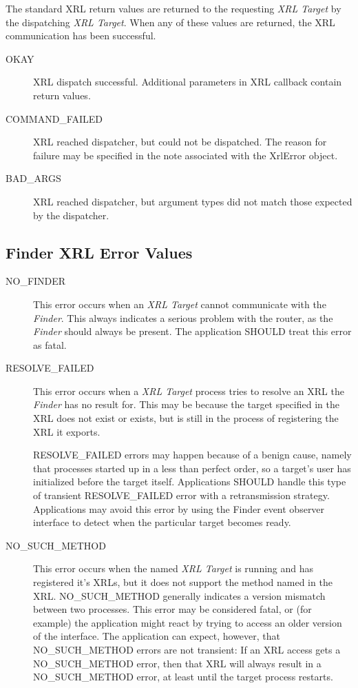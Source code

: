 \documentclass[11pt]{article}
\makeatletter
\newcommand{\finder} {{\em Finder}\@\xspace}
\newcommand{\xt} {{\em XRL Target}\@\xspace}
\makeatother
\begin{document}
The standard XRL return values are returned to the requesting \xt by
the dispatching \xt.  When any of these values are returned, the XRL
communication has been successful.

\begin{description}

  \item [OKAY] XRL dispatch successful.  Additional parameters in
  XRL callback contain return values.

  \item [COMMAND\_FAILED] XRL reached dispatcher, but could not be
  dispatched. The reason for failure may be specified in the note
  associated with the XrlError object.

  \item [BAD\_ARGS] XRL reached dispatcher, but argument types did not match
  those expected by the dispatcher.

\end{description}

\subsection*{Finder XRL Error Values}

\begin{description}

  \item [NO\_FINDER] This error occurs when an \xt cannot communicate
  with the \finder. This always indicates a serious problem with the
  router, as the \finder should always be present. The application
  SHOULD treat this error as fatal.

  \item [RESOLVE\_FAILED] This error occurs when a \xt process tries to
  resolve an XRL the \finder has no result for.  This may be because the
  target specified in the XRL does not exist or exists, but is still in
  the process of registering the XRL it exports.

  RESOLVE\_FAILED errors may happen because of a benign cause, namely
  that processes started up in a less than perfect order, so a target's
  user has initialized before the target itself. Applications SHOULD
  handle this type of transient RESOLVE\_FAILED error with a
  retransmission strategy.  Applications may avoid this error by using
  the Finder event observer interface to detect when the particular
  target becomes ready.

  \item [NO\_SUCH\_METHOD] This error occurs when the named \xt is running and
  has registered 
  it's XRLs, but it does not support the method named in the XRL.
  NO\_SUCH\_METHOD generally indicates a version mismatch between two
  processes. This error may be considered fatal, or (for example) the
  application might react by trying to access an older version of the
  interface. The application can expect, however, that NO\_SUCH\_METHOD
  errors are not transient: If an XRL access gets a NO\_SUCH\_METHOD
  error, then that XRL will always result in a NO\_SUCH\_METHOD error,
  at least until the target process restarts.

\end{description}
\end{document}
